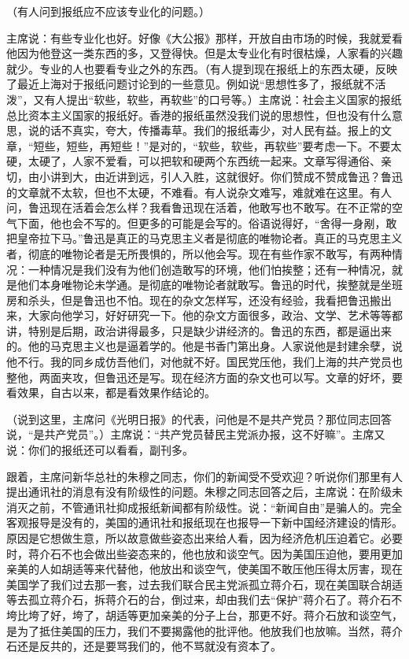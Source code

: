 （有人问到报纸应不应该专业化的问题。）

主席说：有些专业化也好。好像《大公报》那样，开放自由市场的时候，我就爱看他因为他登这一类东西的多，又登得快。但是太专业化有时很枯燥，人家看的兴趣就少。专业的人也要看专业之外的东西。（有人提到现在报纸上的东西太硬，反映了最近上海对于报纸问题讨论到的一些意见。例如说“思想性多了，报纸就不活泼”，又有人提出“软些，软些，再软些”的口号等。）主席说：社会主义国家的报纸总比资本主义国家的报纸好。香港的报纸虽然没我们说的思想性，但也没有什么意思，说的话不真实，夸大，传播毒草。我们的报纸毒少，对人民有益。报上的文章，“短些，短些，再短些！”是对的，“软些，软些，再软些”要考虑一下。不要太硬，太硬了，人家不爱看，可以把软和硬两个东西统一起来。文章写得通俗、亲切，由小讲到大，由近讲到远，引人入胜，这就很好。你们赞成不赞成鲁迅？鲁迅的文章就不太软，但也不太硬，不难看。有人说杂文难写，难就难在这里。有人问，鲁迅现在活着会怎么样？我看鲁迅现在活着，他敢写也不敢写。在不正常的空气下面，他也会不写的。但更多的可能是会写的。俗语说得好，“舍得一身剐，敢把皇帝拉下马。”鲁迅是真正的马克思主义者是彻底的唯物论者。真正的马克思主义者，彻底的唯物论者是无所畏惧的，所以他会写。现在有些作家不敢写，有两种情况：一种情况是我们没有为他们创造敢写的环境，他们怕挨整；还有一种情况，就是他们本身唯物论未学通。是彻底的唯物论者就敢写。鲁迅的时代，挨整就是坐班房和杀头，但是鲁迅也不怕。现在的杂文怎样写，还没有经验，我看把鲁迅搬出来，大家向他学习，好好研究一下。他的杂文方面很多，政治、文学、艺术等等都讲，特别是后期，政治讲得最多，只是缺少讲经济的。鲁迅的东西，都是逼出来的。他的马克思主义也是逼着学的。他是书香门第出身。人家说他是封建余孽，说他不行。我的同乡成仿吾他们，对他就不好。国民党压他，我们上海的共产党员也整他，两面夹攻，但鲁迅还是写。现在经济方面的杂文也可以写。文章的好坏，要看效果，自古以来，都是看效果作结论的。

（说到这里，主席问《光明日报》的代表，问他是不是共产党员？那位同志回答说，“是共产党员”。）主席说：“共产党员替民主党派办报，这不好嘛”。主席又说：你们的报纸还可以看看，副刊多。

跟着，主席问新华总社的朱穆之同志，你们的新闻受不受欢迎？听说你们那里有人提出通讯社的消息有没有阶级性的问题。朱穆之同志回答之后，主席说：在阶级未消灭之前，不管通讯社抑成报纸新闻都有阶级性。说：“新闻自由”是骗人的。完全客观报导是没有的，美国的通讯社和报纸现在也报导一下新中国经济建设的情形。原因是它想做生意，所以故意做些姿态出来给人看，因为经济危机压迫着它。必要时，蒋介石不也会做出些姿态来的，他也放和谈空气。因为美国压迫他，要用更加亲美的人如胡适等来代替他，他放出和谈空气，使美国不敢压他压得太厉害，现在美国学了我们过去那一套，过去我们联合民主党派孤立蒋介石，现在美国联合胡适等去孤立蒋介石，拆蒋介石的台，倒过来，却由我们去“保护”蒋介石了。蒋介石不垮比垮了好，垮了，胡适等更加亲美的分子上台，那更不好。蒋介石放和谈空气，是为了抵住美国的压力，我们不要揭露他的批评他。他放我们也放嘛。当然，蒋介石还是反共的，还是要骂我们的，他不骂就没有资本了。


